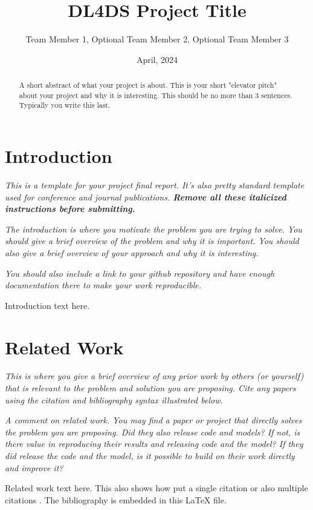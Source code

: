 \documentclass[11pt, oneside]{article}   	%
\title{DL4DS Project Title}
\author{Team Member 1, Optional Team Member 2, Optional Team Member 3}
\date{April, 2024}		%
\begin{document}
\maketitle
\begin{abstract}
A short abstract of what your project is about. This is your short "elevator pitch"
about your project and why it is interesting. This should be no
more than 3 sentences. Typically you write this last.
\end{abstract}

\section*{Introduction}

\textit{This is a template for your project final report. It's also pretty
standard template used for conference and journal publications. 
\textbf{Remove all these italicized instructions before submitting.}}

\textit{The introduction is where you motivate the problem you are trying
to solve. You should give a brief overview of the problem and why it is
important. You should also give a brief overview of your approach and
why it is interesting.}

\textit{You should also include a link to your github repository and have enough
documentation there to make your work reproducible.}

Introduction text here.

\section*{Related Work}

\textit{This is where you give a brief overview of any prior work by
others (or yourself) that is relevant to the problem and solution you
are proposing. Cite any papers using the citation and bibliography syntax illustrated
below.}

\textit{A comment on related work. You may find a paper or project that
directly solves the problem you are proposing. Did they also release code and
models? If not, is there value in reproducing their results and releasing
code and the model? 
If they did release the code and the model, is it possible to build
on their work directly and improve it?}

Related work text here. This also shows how put a single 
citation \cite{citation_key1} or also multiple citations
\cite{citation_key1,citation_key2}.  The bibliography is embedded
in this \LaTeX \hspace*{1pt} file.
\end{document}

